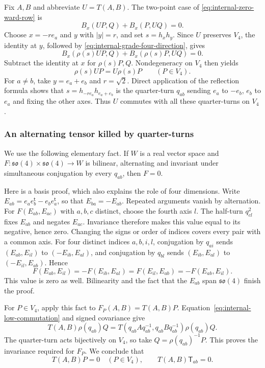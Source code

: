 Fix $A,B$ and abbreviate $U=T(A,B)$. The two-point case of
\eqref{eq:internal-zero-ward-row} is
\begin{equation}\label{eq:internal-two-point-skew}
 B_x(UP,Q)+B_x(P,UQ)=0.
\end{equation}
Choose $x=-re_a$ and $y$ with $|y|=r$, and set $s=h_xh_y$.
Since $U$ preserves $V_4$, the identity at $y$, followed by
\eqref{eq:internal-grade-four-direction}, gives
\[
 B_x(\rho(s)UP,Q)+B_x(\rho(s)P,UQ)=0.
\]
Subtract the identity at $x$ for $\rho(s)P,Q$. Nondegeneracy on $V_4$
then yields
\begin{equation}\label{eq:internal-low-commutation}
 \rho(s)UP=U\rho(s)P\qquad(P\in V_4).
\end{equation}
For $a\ne b$, take $y=e_a+e_b$ and $r=\sqrt2$. Direct application
of the reflection formula shows that $s=h_{-re_a}h_{e_a+e_b}$ is
the quarter-turn $q_{ab}$ sending $e_a$ to $-e_b$, $e_b$ to $e_a$
and fixing the other axes. Thus $U$ commutes with all these
quarter-turns on $V_4$.

\subsubsection{An alternating tensor killed by quarter-turns}
We use the following elementary fact. If $W$ is a real vector space and
$F:\mathfrak{so}(4)\times\mathfrak{so}(4)\to W$ is bilinear,
alternating and invariant under simultaneous conjugation by every
$q_{ab}$, then $F=0$.

Here is a basis proof, which also explains the role of four dimensions.
Write $E_{ab}=e_ae_b^{\mathsf t}-e_be_a^{\mathsf t}$, so that
$E_{ba}=-E_{ab}$. Repeated arguments vanish by alternation. For
$F(E_{ab},E_{ac})$ with $a,b,c$ distinct, choose the fourth axis $l$.
The half-turn $q_{cl}^2$ fixes $E_{ab}$ and negates $E_{ac}$.
Invariance therefore makes this value equal to its negative, hence zero.
Changing the signs or order of indices covers every pair with a common
axis. For four distinct indices $a,b,i,l$, conjugation by $q_{ai}$
sends $(E_{ab},E_{il})$ to $(-E_{ib},E_{al})$, and conjugation by
$q_{bl}$ sends $(E_{ib},E_{al})$ to $(-E_{il},E_{ab})$. Hence
\[
 F(E_{ab},E_{il})=-F(E_{ib},E_{al})
       =F(E_{il},E_{ab})=-F(E_{ab},E_{il}).
\]
This value is zero as well. Bilinearity and the fact that the $E_{ab}$
span $\mathfrak{so}(4)$ finish the proof.

For $P\in V_4$, apply this fact to $F_P(A,B)=T(A,B)P$.
Equation~\eqref{eq:internal-low-commutation} and signed covariance give
\[
 T(A,B)\rho(q_{ab})Q
 =T(q_{ab}Aq_{ab}^{-1},q_{ab}Bq_{ab}^{-1})\rho(q_{ab})Q.
\]
The quarter-turn acts bijectively on $V_4$, so take
$Q=\rho(q_{ab})^{-1}P$. This proves the invariance required for $F_P$.
We conclude that
\begin{equation}\label{eq:internal-stress-annihilation}
 T(A,B)P=0\quad(P\in V_4),\qquad
 T(A,B)\mathsf T_{ab}=0.
\end{equation}

